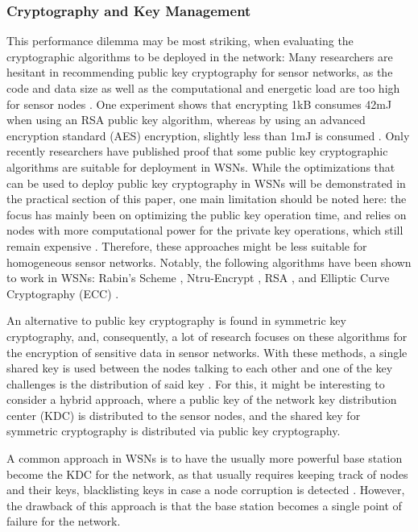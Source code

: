 \documentclass[12pt,a4paper,twoside]{report}
\begin{document}
\subsubsection{Cryptography and Key Management}
This performance dilemma may be most striking, when evaluating the cryptographic algorithms to be deployed in the network: Many researchers are hesitant in recommending public key cryptography for sensor networks, as the code and data size as well as the computational and energetic load are too high for sensor nodes \cite{sen:2009}. One experiment shows that encrypting 1kB consumes 42mJ when using an RSA public key  algorithm, whereas by using an advanced encryption standard (AES) encryption, slightly less than 1mJ is consumed \cite{sen:2009}. Only recently researchers have published proof that some public key cryptographic algorithms are suitable for deployment in WSNs. While the optimizations that can be used to deploy public key cryptography in WSNs will be demonstrated in the practical section of this paper, one main limitation should be noted here: the focus has mainly been on optimizing the public key operation time, and relies on nodes with more computational power for the private key operations, which still remain expensive \cite{sen:2009}. Therefore, these approaches might be less suitable for homogeneous sensor networks. Notably, the following algorithms have been shown to work in WSNs: Rabin's Scheme \cite{rabin:1979}, Ntru-Encrypt \cite{hoffstein;etal:1998}, RSA \cite{RSA:1983}, and Elliptic Curve Cryptography (ECC)\cite{miller:1986} \cite{kobiltz:1987}.\par
An alternative to public key cryptography is found in symmetric key cryptography, and, consequently, a lot of research focuses on these algorithms for the encryption of sensitive data in sensor networks. With these methods, a single shared key is used between the nodes talking to each other and one of the key challenges is the distribution of said key \cite{sen:2009}. For this, it might be interesting to consider a hybrid approach, where a public key of the network key distribution center (KDC) is distributed to the sensor nodes, and the shared key for symmetric cryptography is distributed via public key cryptography.\par
A common approach in WSNs is to have the usually more powerful base station become the KDC for the network, as that usually requires keeping track of nodes and their keys, blacklisting keys in case a node corruption is detected \cite{sen:2009}. However, the drawback of this approach is that the base station becomes a single point of failure for the network.\par
\end{document}
